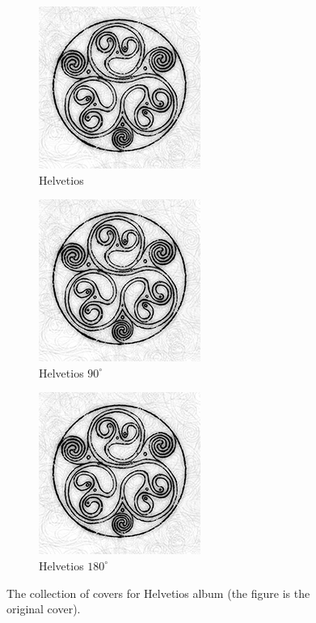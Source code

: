 \documentclass{article}
\begin{document}
\begin{figure}
	\centering
	
	\begin{subfigure}[b]{0.3\textwidth}
		\includegraphics[scale=0.5]{helvetios}
		\caption{Helvetios}
		\label{fig:helvetios}
	\end{subfigure}
	\begin{subfigure}[b]{0.3\textwidth}
		\includegraphics[scale=0.5,angle=90]{helvetios}
		\caption{Helvetios $90^{\circ}$}
		\label{fig:helvetios90}
	\end{subfigure}
	\begin{subfigure}[b]{0.3\textwidth}
		\includegraphics[scale=0.5,angle=180]{helvetios}
		\caption{Helvetios $180^{\circ}$}
		\label{fig:helvetios180}
	\end{subfigure}
	
	\caption{The collection of covers for Helvetios album (the figure  is the original cover).}
\end{figure}
\end{document}
